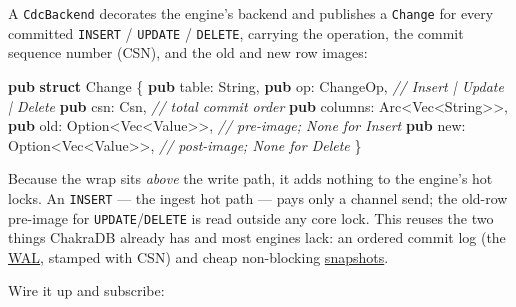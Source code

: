 \documentclass[
  11pt,
  openany]{book}
\newenvironment{Shaded}{}{}
\newcommand{\CommentTok}[1]{\textcolor[rgb]{0.38,0.63,0.69}{\textit{#1}}}
\newcommand{\DataTypeTok}[1]{\textcolor[rgb]{0.56,0.13,0.00}{#1}}
\newcommand{\KeywordTok}[1]{\textcolor[rgb]{0.00,0.44,0.13}{\textbf{#1}}}
\newcommand{\NormalTok}[1]{#1}
\newcommand{\OperatorTok}[1]{\textcolor[rgb]{0.40,0.40,0.40}{#1}}
\begin{document}
A \texttt{CdcBackend} decorates the engine's backend and publishes a
\texttt{Change} for every committed \texttt{INSERT} / \texttt{UPDATE} /
\texttt{DELETE}, carrying the operation, the commit sequence number
(CSN), and the old and new row images:

\begin{Shaded}
\begin{Highlighting}[]
\KeywordTok{pub} \KeywordTok{struct}\NormalTok{ Change }\OperatorTok{\{}
    \KeywordTok{pub}\NormalTok{ table}\OperatorTok{:} \DataTypeTok{String}\OperatorTok{,}
    \KeywordTok{pub}\NormalTok{ op}\OperatorTok{:}\NormalTok{ ChangeOp}\OperatorTok{,}          \CommentTok{// Insert | Update | Delete}
    \KeywordTok{pub}\NormalTok{ csn}\OperatorTok{:}\NormalTok{ Csn}\OperatorTok{,}              \CommentTok{// total commit order}
    \KeywordTok{pub}\NormalTok{ columns}\OperatorTok{:}\NormalTok{ Arc}\OperatorTok{\textless{}}\DataTypeTok{Vec}\OperatorTok{\textless{}}\DataTypeTok{String}\OperatorTok{\textgreater{}\textgreater{},}
    \KeywordTok{pub}\NormalTok{ old}\OperatorTok{:} \DataTypeTok{Option}\OperatorTok{\textless{}}\DataTypeTok{Vec}\OperatorTok{\textless{}}\NormalTok{Value}\OperatorTok{\textgreater{}\textgreater{},}   \CommentTok{// pre{-}image; None for Insert}
    \KeywordTok{pub}\NormalTok{ new}\OperatorTok{:} \DataTypeTok{Option}\OperatorTok{\textless{}}\DataTypeTok{Vec}\OperatorTok{\textless{}}\NormalTok{Value}\OperatorTok{\textgreater{}\textgreater{},}   \CommentTok{// post{-}image; None for Delete}
\OperatorTok{\}}
\end{Highlighting}
\end{Shaded}

Because the wrap sits \emph{above} the write path, it adds nothing to
the engine's hot locks. An \texttt{INSERT} --- the ingest hot path ---
pays only a channel send; the old-row pre-image for
\texttt{UPDATE}/\texttt{DELETE} is read outside any core lock. This
reuses the two things ChakraDB already has and most engines lack: an
ordered commit log (the \href{../engine/durability.md}{WAL}, stamped
with CSN) and cheap non-blocking \href{../engine/mvcc.md}{snapshots}.

Wire it up and subscribe:
\end{document}
